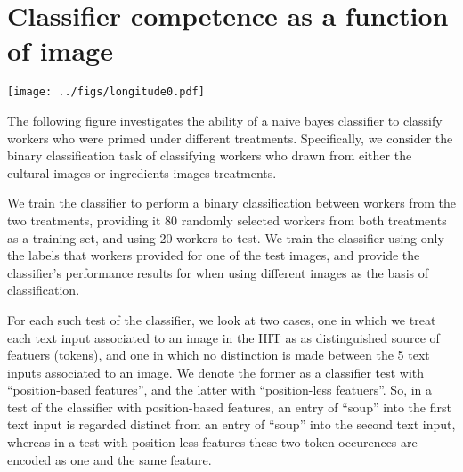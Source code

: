 \documentclass[letterpaper]{article}
\title{}
\author{}
\begin{document}
\maketitle
\section{Classifier competence as a function of image}
\texttt{[image: ../figs/longitude0.pdf]}

The following figure investigates the ability of a naive bayes classifier to 
classify workers who were primed under different treatments.  Specifically, 
we consider the binary classification task of classifying workers who drawn 
from either the cultural-images or ingredients-images treatments.

We train the classifier to perform a binary classification between workers 
from the two treatments, providing it 80 randomly selected workers from 
both treatments as a training set, and using 20 workers to test.  We train
the classifier using only the labels that workers provided for one of the
test images, and provide the classifier's performance results for when using
different images as the basis of classification.  

For each such test of the classifier, we look at two cases, one in which we
treat each text input associated to an image in the HIT as as distinguished
source of featuers (tokens), and one in which no distinction is made between
the 5 text inputs associated to an image.  We denote the former as a 
classifier test with ``position-based features'', and the latter with 
``position-less featuers''.  So, in a test of the classifier with 
position-based features, an entry of ``soup'' into the first 
text input is regarded distinct from an entry of  ``soup'' into the second 
text input, whereas in a test with position-less features
these two token occurences are encoded as one and the same feature.
\end{document}

